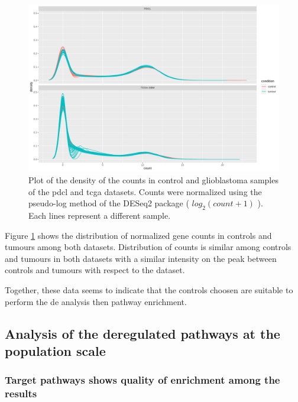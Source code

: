 \begin{figure}
    \includegraphics[width=\textwidth]{img/density_plot}
    \caption{
        Plot of the density of the counts in control and glioblastoma samples of the \acrshort{pdcl} and \acrshort{tcga} datasets.
        Counts were normalized using the pseudo-log method of the DESeq2 package ( $log_2(count+1)$ ).
        Each lines represent a different sample.
    }
    \label{fig:density-plot}
\end{figure}

Figure \ref*{fig:density-plot} shows the distribution of normalized gene counts in controls and tumours among both datasets.
Distribution of counts is similar among controls and tumours in both datasets with a similar intensity on the peak between controls and tumours with respect to the dataset.

Together, these data seems to indicate that the controls choosen are suitable to perform the \acrlong{de} analysis then pathway enrichment.

\subsection{Analysis of the deregulated pathways at the population scale}

\subsubsection{Target pathways shows quality of enrichment among the results}


